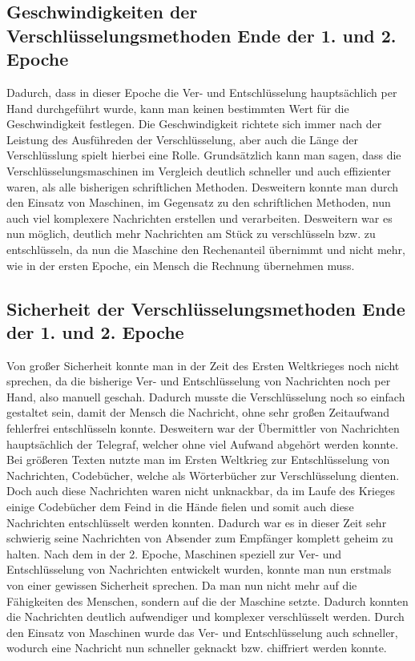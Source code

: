 \subsection{Geschwindigkeiten der Verschlüsselungsmethoden Ende der 1. und 2. Epoche}
Dadurch, dass in dieser Epoche die Ver- und Entschlüsselung hauptsächlich per Hand durchgeführt wurde, kann man keinen bestimmten Wert für die Geschwindigkeit festlegen. Die Geschwindigkeit richtete sich immer nach der Leistung des Ausführeden der Verschlüsselung, aber auch die Länge der Verschlüsslung spielt hierbei eine Rolle. Grundsätzlich kann man sagen, dass die Verschlüsselungsmaschinen im Vergleich deutlich schneller und auch effizienter waren, als alle bisherigen schriftlichen Methoden. Desweitern konnte man durch den Einsatz von Maschinen, im Gegensatz zu den schriftlichen Methoden, nun auch viel komplexere Nachrichten erstellen und verarbeiten. Desweitern war es nun möglich, deutlich mehr Nachrichten am Stück zu verschlüsseln bzw. zu entschlüsseln, da nun die Maschine den Rechenanteil übernimmt und nicht mehr, wie in der ersten Epoche, ein Mensch die Rechnung übernehmen muss.\\


\subsection{Sicherheit der Verschlüsselungsmethoden Ende der 1. und 2. Epoche}
Von großer Sicherheit konnte man in der Zeit des Ersten Weltkrieges noch nicht sprechen, da die bisherige Ver- und Entschlüsselung von Nachrichten noch per Hand, also manuell geschah. Dadurch musste die Verschlüsselung noch so einfach gestaltet sein, damit der Mensch die Nachricht, ohne sehr großen Zeitaufwand fehlerfrei entschlüsseln konnte. Desweitern war der Übermittler von Nachrichten hauptsächlich der Telegraf, welcher ohne viel Aufwand abgehört werden konnte. Bei größeren Texten nutzte man im Ersten Weltkrieg zur Entschlüsselung von Nachrichten, Codebücher, welche als Wörterbücher zur Verschlüsselung dienten. Doch auch diese Nachrichten waren nicht unknackbar, da im Laufe des Krieges einige Codebücher dem Feind in die Hände fielen und somit auch diese Nachrichten entschlüsselt werden konnten. Dadurch war es in dieser Zeit sehr schwierig seine Nachrichten von Absender zum Empfänger komplett geheim zu halten. Nach dem in der 2. Epoche, Maschinen speziell zur Ver- und Entschlüsselung von Nachrichten entwickelt wurden, konnte man nun erstmals von einer gewissen Sicherheit sprechen. Da man nun nicht mehr auf die Fähigkeiten des Menschen, sondern auf die der Maschine setzte. Dadurch konnten die Nachrichten deutlich aufwendiger und komplexer verschlüsselt werden. Durch den Einsatz von Maschinen wurde das Ver- und Entschlüsselung auch schneller, wodurch eine Nachricht nun schneller geknackt bzw. chiffriert werden konnte.\\

